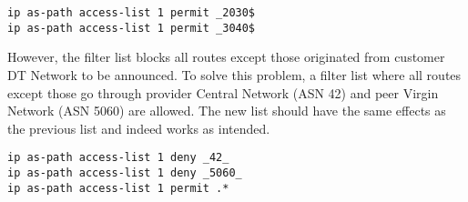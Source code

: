\begin{lstlisting}
ip as-path access-list 1 permit _2030$
ip as-path access-list 1 permit _3040$
\end{lstlisting}

However, the filter list blocks all routes except those originated from customer DT Network to be announced. To solve this problem, a filter list where all routes except those go through provider Central Network (ASN 42) and peer Virgin Network (ASN 5060) are allowed. The new list should have the same effects as the previous list and indeed works as intended.

\begin{lstlisting}
ip as-path access-list 1 deny _42_
ip as-path access-list 1 deny _5060_
ip as-path access-list 1 permit .*
\end{lstlisting}




